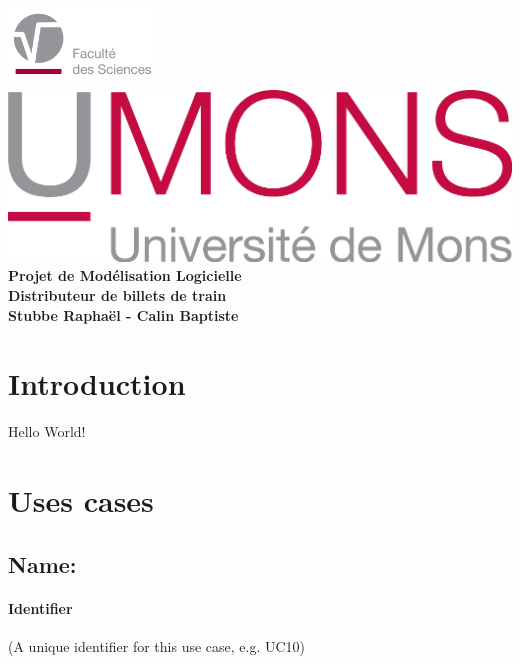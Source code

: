 \documentclass{report}
\begin{document}
\begin{titlepage}
    \includegraphics[width=4cm]{fslogo.jpg} %
    \centering
    \vfill
    \includegraphics{UMONS} %
    \vfill
    {\bfseries\Large
        Projet	de	Mod\'elisation	Logicielle\\
        Distributeur de	billets	de train\\
        \vskip2cm
        Stubbe Rapha\"el - Calin Baptiste\\
    }

    \vfill
    \vfill
    \vfill
\end{titlepage}

\newpage

\tableofcontents

\newpage


\section{Introduction}
  Hello World!

  \newpage
\section{Uses cases}
\subsection{Name:}


  \paragraph{Identifier}

  (A unique identifier for this use case, e.g. UC10)
\end{document}
